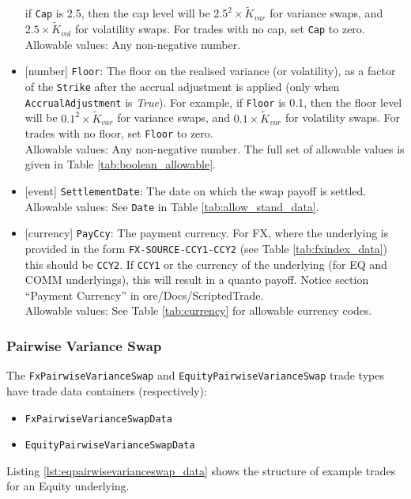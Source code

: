\begin{itemize}
  if \lstinline!Cap! is 2.5, then the cap level will be $2.5^2 \times \widetilde{K}_{var}$ for variance swaps, and
  $2.5 \times \widetilde{K}_{vol}$ for volatility swaps. For trades with no cap, set \lstinline!Cap! to zero. \\
  Allowable values: Any non-negative number.
  \item{}[number] \lstinline!Floor!: The floor on the realised variance (or volatility), as a factor of the \lstinline!Strike! after
  the accrual adjustment is applied (only when \lstinline!AccrualAdjustment! is \emph{True}). For example,
  if \lstinline!Floor! is 0.1, then the floor level will be $0.1^2 \times \widetilde{K}_{var}$ for variance swaps, and
  $0.1 \times \widetilde{K}_{var}$ for volatility swaps. For trades with no floor, set
  \lstinline!Floor! to zero. \\
  Allowable values: Any non-negative number.
  The full set of allowable values is given in Table \ref{tab:boolean_allowable}.
  \item{}[event] \lstinline!SettlementDate!: The date on which the swap payoff is settled. \\
  Allowable values: See \lstinline!Date! in Table \ref{tab:allow_stand_data}.
  \item{}[currency] \lstinline!PayCcy!: The payment currency. For FX, where the underlying is provided
      in the form \lstinline!FX-SOURCE-CCY1-CCY2! (see Table \ref{tab:fxindex_data}) this should
      be \lstinline!CCY2!. If \lstinline!CCY1! or the currency of the underlying (for EQ and
      COMM underlyings), this will result in a quanto payoff. Notice section ``Payment Currency'' in ore/Docs/ScriptedTrade. \\
        Allowable values: See Table \ref{tab:currency} for allowable currency codes.
\end{itemize}

\subsubsection*{Pairwise Variance Swap}

The \lstinline!FxPairwiseVarianceSwap! and \lstinline!EquityPairwiseVarianceSwap! trade types
have trade data containers (respectively):
\begin{itemize}
  \item \lstinline!FxPairwiseVarianceSwapData!
  \item \lstinline!EquityPairwiseVarianceSwapData!
\end{itemize}
Listing \ref{lst:eqpairwisevarianceswap_data} shows the structure of example trades for an Equity underlying.

